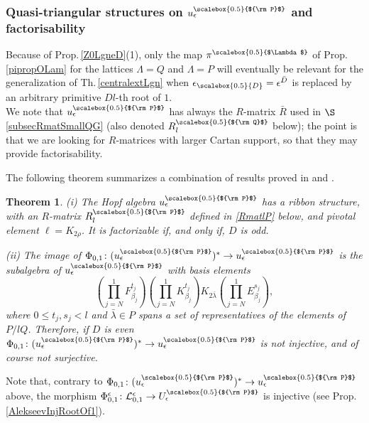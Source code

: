 \documentclass[11pt]{amsart}
\newtheorem{teo}{Theorem}[section]
\newcommand{\e}{\epsilon}
\newcommand{\Ll}{\mathcal{L}}
\newcommand{\eD}{\epsilon_{\scalebox{0.5}{D}}}
\newcommand{\Q}{{\scalebox{0.5}{${\rm Q}$}}}
\newcommand{\Pup}{{\scalebox{0.5}{${\rm P}$}}}
\newcommand{\Lam}{{\scalebox{0.5}{$\Lambda$}}}
\begin{document}
\subsubsection{Quasi-triangular structures on \texorpdfstring{$u_\e^\Pup$}{the small quantum group} and factorisability}\label{subsec:qtsuefev26} Because of Prop.\,\ref{Z0LgneD}(1), only the map $\pi^\Lam$ of Prop.\,\ref{pipropOLam} for the lattices $\Lambda=Q$ and $\Lambda=P$ will eventually be relevant for the generalization of Th.\,\ref{centralextLgn} when $\eD=\e^{\bar{D}}$ is replaced by an arbitrary primitive $Dl$-th root of $1$.\\
We note that $u_\e^\Pup$ has always the $R$-matrix $\bar{R}$ used in $\S$\ref{subsecRmatSmallQG} (also denoted $R_l^\Q$ below); the point is that we are looking for $R$-matrices with larger Cartan support, so that they may provide factorisability.

\smallskip

\indent The following theorem summarizes a combination of results proved in \cite[App.\,A1-A3]{Lyub95} and \cite{LN,LO}.

\begin{teo}\label{teosmallqg} (i) The Hopf algebra $u_\e^\Pup$ has a ribbon structure, with an $R$-matrix $R_l^\Pup$ defined in \eqref{RmatlP} below, and pivotal element $\ell=K_{2\rho}$. It is factorizable if, and only if, $D$ is odd.

(ii) The image of $\Phi_{0,1}\colon (u_\e^{\Pup})^* \to u_\e^{\Pup}$ is the subalgebra of $u_\e^{\Pup}$ with basis elements \begin{equation}\label{basisPhi01}\textstyle \left(\prod_{j=N}^1 F_{\beta_j}^{t_j}\right) \left(\prod_{j=N}^1 K_{\beta_j}^{t_j}\right) K_{2\bar{\lambda}} \left(\prod_{j=N}^1 E_{\beta_j}^{s_j}\right),
\end{equation}
where $0\leq t_j, s_j< l$ and $\bar{\lambda}\in P$ spans a set of representatives of the elements of $P/lQ$. Therefore, if $D$ is even $\Phi_{0,1}\colon (u_\e^{\Pup})^* \to u_\e^{\Pup}$ is not injective, and of course not surjective.
\end{teo}
Note that, contrary to $\Phi_{0,1}\colon (u_\e^{\Pup})^* \to u_\e^{\Pup}$ above, the morphism $\Phi_{0,1}^{\e}\colon \Ll_{0,1}^\e \to U_\e^{\Pup}$ is injective (see Prop.\,\ref{AlekseevInjRootOf1}).
\end{document}
